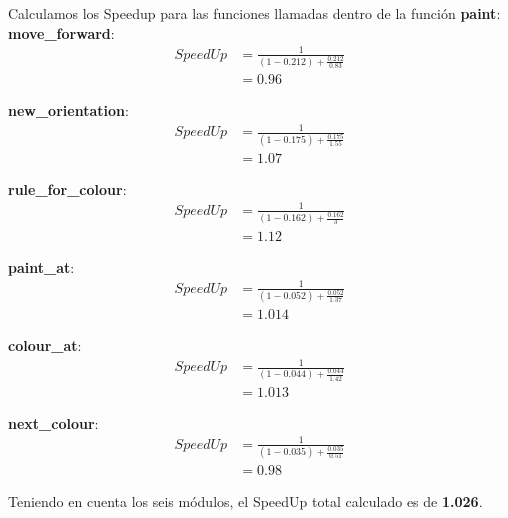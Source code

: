 \documentclass[a4paper, 10pt, twoside, notitlepage]{article}
\begin{document}
 Calculamos los Speedup para las funciones llamadas dentro de la función \textbf{paint}:\\
 
\textbf{move\_forward}:
\begin{equation*} 
\begin{split}
 SpeedUp & =\frac{1}{(1-0.212) + \frac{0.212}{0.83}} \\
  &= 0.96
\end{split}
\end{equation*}

\textbf{new\_orientation}:
\begin{equation*} 
\begin{split}
 SpeedUp &=\frac{1}{(1-0.175) + \frac{0.175}{1.55}} \\
  &= 1.07
\end{split}
\end{equation*}

\textbf{rule\_for\_colour}:
\begin{equation*} 
\begin{split}
 SpeedUp &=\frac{1}{(1-0.162) + \frac{0.162}{3}} \\
  &= 1.12
\end{split}
\end{equation*}

\textbf{paint\_at}:
\begin{equation*} 
\begin{split}
 SpeedUp &=\frac{1}{(1-0.052) + \frac{0.052}{1.37}} \\
  &= 1.014
\end{split}
\end{equation*}

\textbf{colour\_at}:
\begin{equation*} 
\begin{split}
 SpeedUp &=\frac{1}{(1-0.044) + \frac{0.044}{1.42}} \\
  &= 1.013
\end{split}
\end{equation*}

\textbf{next\_colour}:
\begin{equation*} 
\begin{split}
 SpeedUp &=\frac{1}{(1-0.035) + \frac{0.035}{0.51}} \\
  &= 0.98
\end{split}
\end{equation*}

Teniendo en cuenta los seis módulos, el SpeedUp total calculado es de \textbf{1.026}.
\newpage
\end{document}
